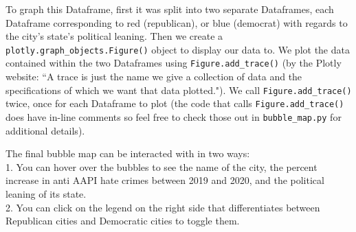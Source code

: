 \documentclass[fontsize=11pt]{article}
\begin{document}
To graph this Dataframe, first it was split into two separate Dataframes, each Dataframe corresponding to red (republican), or blue (democrat) with regards to the city's state's political leaning. Then we create a \newline \texttt{plotly.graph\_objects.Figure()} object to display our data to. We plot the data contained within the two Dataframes using \texttt{Figure.add\_trace()} (by the Plotly website: “A trace is just the name we give a collection of data and the specifications of which we want that data plotted."). We call \texttt{Figure.add\_trace()} twice, once for each Dataframe to plot (the code that calls \texttt{Figure.add\_trace()} does have in-line comments so feel free to check those out in \texttt{bubble\_map.py} for additional details).

The final bubble map can be interacted with in two ways: \\
1. You can hover over the bubbles to see the name of the city, the percent increase in anti AAPI hate crimes between 2019 and 2020, and the political leaning of its state. \\
2. You can click on the legend on the right side that differentiates between Republican cities and Democratic cities to toggle them. \\
\end{document}
